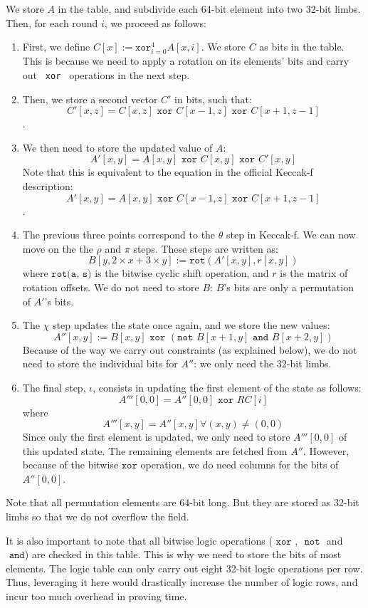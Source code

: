 We store $A$ in the table, and subdivide each 64-bit element into two 32-bit limbs.
Then, for each round $i$, we proceed as follows:
\begin{enumerate}
    \item First, we define $C[x] := \texttt{xor}_{i=0}^4 A[x, i]$. We store $C$ as bits in the table. This is because we need to apply a rotation on its elements' bits and carry out \texttt{ xor } operations in the next step.
    \item Then, we store a second vector $C'$ in bits, such that: $$C'[x, z] = C[x, z] \texttt{ xor } C[x-1, z] \texttt{ xor } C[x+1, z-1]$$. 
    \item We then need to store the updated value of $A$: $$A'[x, y] = A[x, y] \texttt{ xor } C[x, y] \texttt{ xor } C'[x, y]$$ Note that this is equivalent to the equation in the official Keccak-f description: $$A'[x, y] = A[x, y] \texttt{ xor } C[x-1, z] \texttt{ xor } C[x+1, z-1]$$.
    \item The previous three points correspond to the $\theta$ step in Keccak-f. We can now move on the the $\rho$ and $\pi$ steps. These steps are written as: $$B[y, 2\times x + 3 \times y] := \texttt{rot}(A'[x, y], r[x, y])$$ where $\texttt{rot(a, s)}$ is the bitwise cyclic shift operation, and $r$ is the matrix of rotation offsets. We do not need to store $B$: $B$'s bits are only a permutation of $A'$'s bits. 
    \item The $\chi$ step updates the state once again, and we store the new values: $$A''[x, y] := B[x, y] \texttt{ xor } (\texttt{not }B[x+1, y] \texttt{ and } B[x+2, y])$$ Because of the way we carry out constraints (as explained below), we do not need to store the individual bits for $A''$: we only need the 32-bit limbs.
    \item The final step, $\iota$, consists in updating the first element of the state as follows: $$A'''[0, 0] = A''[0, 0] \texttt{ xor } RC[i]$$ where $$A'''[x, y] = A''[x, y] \forall (x, y) \neq (0, 0)$$ Since only the first element is updated, we only need to store $A'''[0, 0]$ of this updated state. The remaining elements are fetched from $A''$. However, because of the bitwise $\texttt{xor}$ operation, we do need columns for the bits of $A''[0, 0]$.  
\end{enumerate}

Note that all permutation elements are 64-bit long. But they are stored as 32-bit limbs so that we do not overflow the field. 

It is also important to note that all bitwise logic operations ($\texttt{ xor }$, $\texttt{ not }$ and $\texttt{ and}$) are checked in this table. This is why we need to store the bits of most elements. The logic table can only carry out eight 32-bit logic operations per row. Thus, leveraging it here would drastically increase the number of logic rows, and incur too much overhead in proving time.



